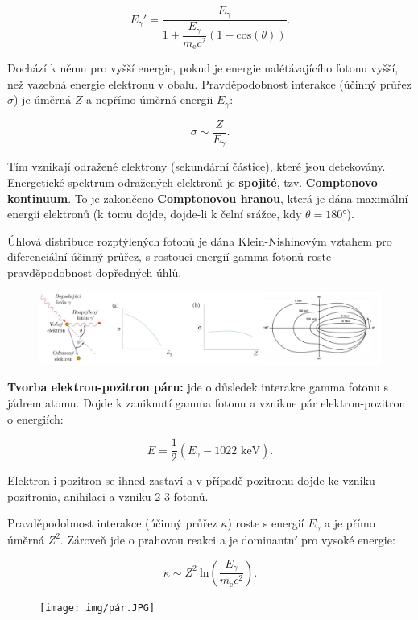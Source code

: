 $$ E_\gamma' = \dfrac{E_\gamma}{1 + \dfrac{E_\gamma}{m_\text{e}c^2}(1 - \text{cos}(\theta))}. $$

Dochází k němu pro vyšší energie, pokud je energie nalétávajícího fotonu vyšší, než vazebná energie elektronu v obalu. Pravděpodobnost interakce (účinný průřez $\sigma$) je úměrná $Z$ a nepřímo úměrná energii $E_\gamma$:

$$ \sigma \sim \dfrac{Z}{E_\gamma}. $$

Tím vznikají odražené elektrony (sekundární částice), které jsou detekovány. Energetické spektrum odražených elektronů je \textbf{spojité}, tzv. \textbf{Comptonovo kontinuum}. To je zakončeno \textbf{Comptonovou hranou}, která je dána maximální energií elektronů (k tomu dojde, dojde-li k čelní srážce, kdy $\theta = 180°$).

Úhlová distribuce rozptýlených fotonů je dána Klein-Nishinovým vztahem pro diferenciální účinný průřez, s rostoucí energií gamma fotonů roste pravděpodobnost dopředných úhlů.

\begin{figure}[H]
    \centering
    \includegraphics[width=1\textwidth]{img/Compton.JPG}
\end{figure}

\textbf{Tvorba elektron-pozitron páru:} jde o důsledek interakce gamma fotonu s jádrem atomu. Dojde k zaniknutí gamma fotonu a vznikne pár elektron-pozitron o energiích:

$$ E = \dfrac{1}{2} (E_\gamma - 1022 \text{ keV}). $$

Elektron i pozitron se ihned zastaví a v případě pozitronu dojde ke vzniku pozitronia, anihilaci a vzniku 2-3 fotonů.

Pravděpodobnost interakce (účinný průřez $\kappa$) roste s energií $E_\gamma$ a je přímo úměrná $Z^2$. Zároveň jde o prahovou reakci a je dominantní pro vysoké energie:

$$ \kappa \sim Z^2 \: \text{ln} \left( \dfrac{E_\gamma}{m_\text{e} c^2} \right). $$

\begin{figure}[H]
    \centering
    \texttt{[image: img/pár.JPG]}
\end{figure}


